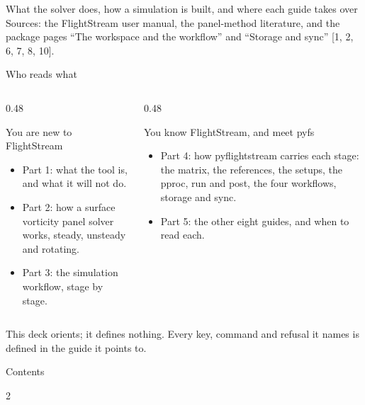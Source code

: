 \documentclass[aspectratio=169,11pt]{beamer}
\begin{document}
  {What the solver does, how a simulation is built, and where each guide
   takes over}
  {Sources: the FlightStream user manual, the panel-method literature, and
   the package pages ``The workspace and the workflow'' and ``Storage and
   sync'' [1, 2, 6, 7, 8, 10].}

\begin{frame}{Who reads what}
\begin{columns}[T]
\begin{column}{0.48\textwidth}
\begin{block}{You are new to FlightStream}
\begin{itemize}\small
  \item Part 1: what the tool is, and what it will not do.
  \item Part 2: how a surface vorticity panel solver works, steady,
        unsteady and rotating.
  \item Part 3: the simulation workflow, stage by stage.
\end{itemize}
\end{block}
\end{column}
\begin{column}{0.48\textwidth}
\begin{block}{You know FlightStream, and meet pyfs}
\begin{itemize}\small
  \item Part 4: how pyflightstream carries each stage: the matrix, the
        references, the setups, the pproc, run and post, the four
        workflows, storage and sync.
  \item Part 5: the other eight guides, and when to read each.
\end{itemize}
\end{block}
\end{column}
\end{columns}
\vspace{2mm}
\begin{takeaway}This deck orients; it defines nothing. Every key, command and
refusal it names is defined in the guide it points to.\end{takeaway}
\end{frame}

\begin{frame}{Contents}
\begin{multicols}{2}
\tableofcontents
\end{multicols}
\end{frame}
\end{document}
